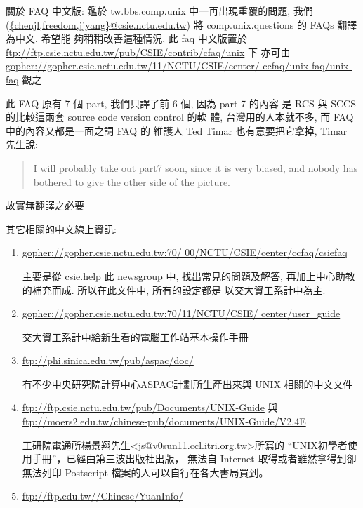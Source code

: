 \documentclass{letter}
\begin{document}
\begin{CJK*}{Bg5}{ming}

關於 FAQ 中文版:
鑑於  tw.bbs.comp.unix 中一再出現重覆的問題, 我們
(\url{{chenjl,freedom,jjyang}@csie.nctu.edu.tw})
將 comp.unix.questions 的 FAQs 翻譯為中文, 希望能
夠稍稍改善這種情況, 此 faq 中文版置於 
\url{ftp://ftp.csie.nctu.edu.tw/pub/CSIE/contrib/cfaq/unix} 下
亦可由 
\url{gopher://gopher.csie.nctu.edu.tw/11/NCTU/CSIE/center/
ccfaq/unix-faq/unix-faq}
觀之

此 FAQ 原有 7 個 part, 我們只譯了前 6 個, 因為 part 7 的內容
是 RCS 與 SCCS 的比較這兩套 source code version control 的軟
體, 台灣用的人本就不多, 而 FAQ 中的內容又都是一面之詞 FAQ 的
維護人 Ted Timar 也有意要把它拿掉, Timar 先生說:
\begin{quote}
   I will probably take out part7 soon, since it is very biased, and nobody
   has bothered to give the other side of the picture.
\end{quote}
故實無翻譯之必要

其它相關的中文線上資訊:
\begin{enumerate}
\item \url{gopher://gopher.csie.nctu.edu.tw:70/
	00/NCTU/CSIE/center/ccfaq/csiefaq}

        主要是從 csie.help 此 newsgroup 中, 找出常見的問題及解答, 
        再加上中心助教的補充而成. 所以在此文件中, 所有的設定都是
        以交大資工系計中為主. 

\item \url{gopher://gopher.csie.nctu.edu.tw:70/11/NCTU/CSIE/
	center/user_guide}

        交大資工系計中給新生看的電腦工作站基本操作手冊

\item \url{ftp://phi.sinica.edu.tw/pub/aspac/doc/}

      有不少中央研究院計算中心ASPAC計劃所生產出來與 UNIX 相關的中文文件

\item \url{ftp://ftp.csie.nctu.edu.tw/pub/Documents/UNIX-Guide} 與
      \url{ftp://moers2.edu.tw/chinese-pub/documents/UNIX-Guide/V2.4E}

        工研院電通所楊景翔先生<js@v0sun11.ccl.itri.org.tw>所寫的
        ``UNIX初學者使用手冊''，已經由第三波出版社出版，
        無法自 Internet 取得或者雖然拿得到卻無法列印 
        Postscript 檔案的人可以自行在各大書局買到。

\item \url{ftp://ftp.edu.tw//Chinese/YuanInfo/}


\end{enumerate}
\end{CJK*}
\end{document}
